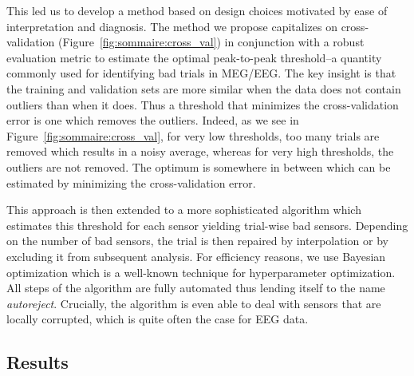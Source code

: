 This led us to develop a method based on design choices motivated by ease of interpretation and diagnosis. 
The method we propose capitalizes on cross-validation (Figure~\ref{fig:sommaire:cross_val}) in conjunction with a robust evaluation metric to estimate the optimal peak-to-peak threshold--a quantity commonly used for identifying bad trials in \ac{MEG}/\ac{EEG}. 
The key insight is that the training and validation sets are more similar when the data does not contain outliers than when it does. Thus a threshold that minimizes the cross-validation error is one which removes the outliers. 
Indeed, as we see in Figure~\ref{fig:sommaire:cross_val}, for very low thresholds, too many trials are removed which results in a noisy average, whereas for very high thresholds, the outliers are not removed. 
The optimum is somewhere in between which can be estimated by minimizing the cross-validation error.

This approach is then extended to a more sophisticated algorithm which estimates this threshold for each sensor yielding trial-wise bad sensors. Depending on the number of bad sensors, the trial is then repaired by interpolation or by excluding it from subsequent analysis. For efficiency reasons, we use Bayesian optimization which is a well-known technique for hyperparameter optimization. All steps of the algorithm are fully automated thus lending itself to the name \emph{autoreject}. Crucially, the algorithm is even able to deal with sensors that are locally corrupted, which is quite often the case for \ac{EEG} data.

\subsection*{Results}

